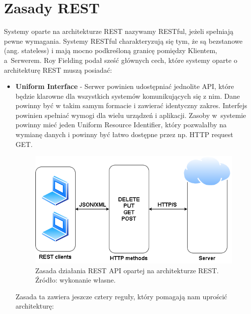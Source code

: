 \documentclass[oneside,polski,logo,indent]{amuthesis}
\begin{document}

\section{Zasady REST}

Systemy oparte na architekturze REST nazywamy RESTful, jeżeli spełniają pewne wymagania. Systemy RESTful charakteryzują się tym, że są bezstanowe (ang. stateless) i mają mocno podkreśloną granicę pomiędzy Klientem, a~Serwerem. Roy Fielding podał sześć głównych cech, które systemy oparte o architekturę REST muszą posiadać: 
 
\begin{itemize}
\item \textbf{Uniform Interface} - Serwer powinien udostępniać jednolite API, które będzie klarowne dla wszystkich systemów komunikujących się z nim. Dane powinny być w takim samym formacie i zawierać identyczny zakres. Interfejs powinien spełniać wymogi dla wielu urządzeń i aplikacji. Zasoby w~systemie powinny mieć jeden Uniform Resource Identifier, który pozwalałby na wymianę danych i powinny być łatwo dostępne przez np. HTTP request GET.
\begin{figure}[H]
\centering
\includegraphics[width=14cm]{restarch.png}
\caption{Zasada działania REST API opartej na architekturze REST. Źródło: wykonanie własne.}
\label{REST API}
\end{figure}


Zasada ta zawiera jeszcze cztery reguły, który pomagają nam uprościć architekturę: 


\end{itemize}
\end{document}
